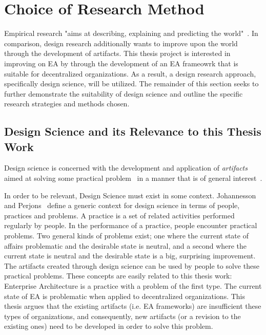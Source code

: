 \section{Choice of Research Method}

Empirical research "aims at describing, explaining and predicting the world"~\cite{johannessonPerjons2012}. In comparison, design research additionally wants to improve upon the world through the development of artifacts. This thesis project is interested in improving on EA by through the development of an EA frameowrk that is suitable for decentralized organizations. As a result, a design research approach, specifically design science, will be utilized. The remainder of this section seeks to further demonstrate the suitability of design science and outline the specific research strategies and methods chosen. 

\subsection{Design Science and its Relevance to this Thesis Work}

Design science is concerned with the development and application of \textit{artifacts} aimed at solving some practical problem~\cite{hevner2004,johannessonPerjons2012} in a manner that is of general interest~\cite{johannessonPerjons2012}. 

In order to be relevant, Design Science must exist in some context. Johannesson and Perjons~\cite{johannessonPerjons2012} define a generic context for design science in terms of people, practices and problems. A practice is a set of related activities performed regularly by people. In the performance of a practice, people encounter practical problems. Two general kinds of problems exist; one where the current state of affairs problematic and the desirable state is neutral, and a second where the current state is neutral and the desirable state is a big, surprising improvement. The artifacts created through design science can be used by people to solve these practical problems. These concepts are easily related to this thesis work: Enterprise Architecture is a practice with a problem of the first type.  The current state of EA is problematic when applied to decentralized organizations. This thesis argues that the existing artifacts (i.e. EA frameworks) are insufficient these types of organizations, and consequently, new artifacts (or a revision to the existing ones) need to be developed in order to solve this problem.

